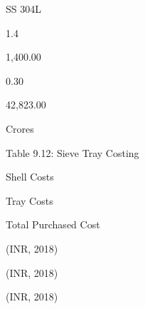 \documentclass[a4paper,portrait,12pt]{article}
\begin{document}
\begin{flushleft}
SS 304L
\end{flushleft}





1.4





1,400.00





0.30





42,823.00





\begin{flushleft}
Crores
\end{flushleft}





\begin{flushleft}
Table 9.12: Sieve Tray Costing
\end{flushleft}





\begin{flushleft}
Shell Costs
\end{flushleft}





\begin{flushleft}
Tray Costs
\end{flushleft}





\begin{flushleft}
Total Purchased Cost
\end{flushleft}





\begin{flushleft}
(INR, 2018)
\end{flushleft}





\begin{flushleft}
(INR, 2018)
\end{flushleft}





\begin{flushleft}
(INR, 2018)
\end{flushleft}
\end{document}
